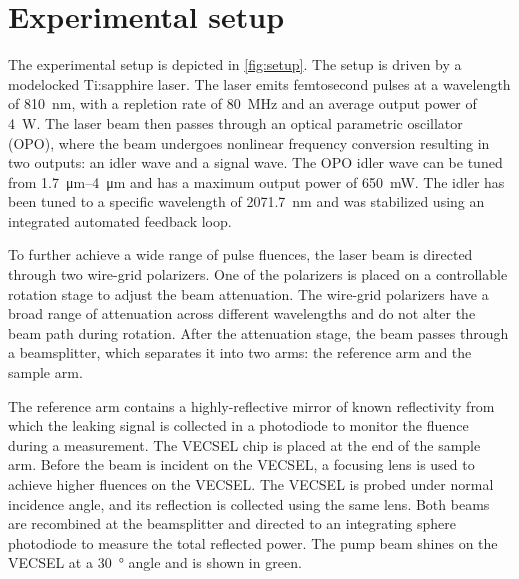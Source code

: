 \section{Experimental setup}\label{sec:setup}

The experimental setup is depicted in \cref{fig:setup}. The setup is driven by a modelocked Ti:sapphire laser. The laser emits femtosecond pulses at a wavelength of \qty{810}{\nm}, with a repletion rate of \qty{80}{\MHz} and an average output power of \qty{4}{\W}. The laser beam then passes through an optical parametric oscillator (OPO), where the beam undergoes nonlinear frequency conversion resulting in two outputs: an idler wave and a signal wave. The OPO idler wave can be tuned from \qtyrange{1.7}{4}{\um} and has a maximum output power of \qty{650}{\mW}. The idler has been tuned to a specific wavelength of \qty{2071.7}{\nm} and was stabilized using an integrated automated feedback loop.

To further achieve a wide range of pulse fluences, the laser beam is directed through two wire-grid polarizers. One of the polarizers is placed on a controllable rotation stage to adjust the beam attenuation. The wire-grid polarizers have a broad range of attenuation across different wavelengths and do not alter the beam path during rotation. After the attenuation stage, the beam passes through a beamsplitter, which separates it into two arms: the reference arm and the sample arm. 

The reference arm contains a highly-reflective mirror of known reflectivity from which the leaking signal is collected in a photodiode to monitor the fluence during a measurement. 
The VECSEL chip is placed at the end of the sample arm. Before the beam is incident on the VECSEL, a focusing lens is used to achieve higher fluences on the VECSEL. The VECSEL is probed under normal incidence angle, and its reflection is collected using the same lens. Both beams are recombined at the beamsplitter and directed to an integrating sphere photodiode to measure the total reflected power. The pump beam shines on the VECSEL at a \qty{30}{\degree} angle and is shown in green. 

